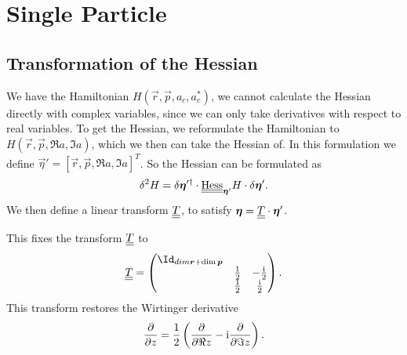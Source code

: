 \chapter{Single Particle}
\section{Transformation of the Hessian}
\label{apdx:sp:hessian:1d}

We have the Hamiltonian $H(\vec r, \vec p, a_c, a_c^*)$, 
    we cannot calculate the Hessian directly with complex variables,
    since we can only take derivatives with respect to real variables.
To get the Hessian,
    we reformulate the Hamiltonian to $H(\vec r, \vec p, \Re a, \Im a)$,
    which we then can take the Hessian of.
In this formulation we define $\vec\eta' = [\vec r, \vec p, \Re a, \Im a]^T$.
So the Hessian can be formulated as
\begin{equation}
\label{apdx:hess:1d:deletas}
    \delta^2 H = \delta \bm{\eta}'^\dagger \cdot \underline{\underline{\mathrm{Hess}}}_{\bm{\eta}'}{H} \cdot \delta \bm{\eta}'.
\end{equation}
We then define a linear transform $\underline{\underline{T}}$,
    to satisfy $\bm{\eta} = \underline{\underline{T}}\cdot\bm{\eta}'$.

This fixes the transform $\underline{\underline{T}}$ to
\begin{equation}
    \mat{T} = \begin{pmatrix}
        \Id_{dim\vec r + \dim\vec p} \\
        & \tfrac12 & - \tfrac{\i}{2} \\
        & \tfrac{1}{2} & \tfrac{\i}{2}
    \end{pmatrix}.
\end{equation}
This transform restores the Wirtinger derivative
\begin{equation}
    \frac{\partial}{\partial z} = 
        \frac{1}{2} 
            \left( \frac{\partial}{\partial\Re z} - \mathrm{i} \frac{\partial}{\partial\Im z}\right).
\end{equation}



